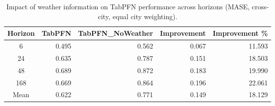 \begin{table}
\centering
\caption{Impact of weather information on TabPFN performance across horizons (MASE, cross-city, equal city weighting).}
\label{tab:tabpfn_weather_cross_city_by_horizon}
\begin{tabular}{crrrr}
\toprule
Horizon & TabPFN & TabPFN\_NoWeather & Improvement & Improvement \% \\
\midrule
6 & 0.495 & 0.562 & 0.067 & 11.593 \\
24 & 0.635 & 0.787 & 0.151 & 18.503 \\
48 & 0.689 & 0.872 & 0.183 & 19.990 \\
168 & 0.669 & 0.864 & 0.196 & 22.061 \\
\midrule
Mean & 0.622 & 0.771 & 0.149 & 18.129 \\
\bottomrule
\end{tabular}
\end{table}
